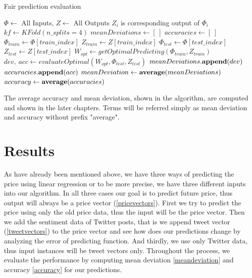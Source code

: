 \documentclass[a4paper,11pt,oneside]{article}
\begin{document}
  \begin{algorithm}
  	\caption{Fair prediction evaluation}
  	\begin{algorithmic} 
  		\REQUIRE $\Phi \leftarrow$ All Inputs, $Z \leftarrow$ All Outputs
  		\ENSURE $Z_i$ is corresponding output of $\Phi_i$ 
  		\STATE 
  		$kf \leftarrow KFold(n\_splits=4)$ \cite{pythonkfold}
  		\STATE $meanDeviations \leftarrow [\ ]$
  		\STATE $accuracies \leftarrow [\ ]$
  		\STATE $\Phi_{train} \leftarrow \Phi[train\_index]$
  		\STATE $Z_{train} \leftarrow Z[train\_index]$
  		\STATE $\Phi_{test} \leftarrow \Phi[test\_index]$
  		\STATE $Z_{test} \leftarrow Z[test\_index]$
  		\STATE $W_{opt}  \leftarrow getOptimalPredicting(\Phi_{train}, Z_{train})$
  		\STATE $dev,\ acc \leftarrow evaluateOptimal(W_{opt}, \Phi_{test}, Z_{test})$
  		\STATE $ meanDeviations{\bf .append}(dev) $
  		\STATE $ accuracies{\bf .append}(acc) $
  		\ENDFOR
  		\STATE $meanDeviation \leftarrow {\bf average}(meanDeviations)$
  		\STATE $accuracy \leftarrow {\bf average}(accuracies)$
  	\end{algorithmic}
  \end{algorithm}
  
  The average accuracy and mean deviation, shown in the algorithm, are computed and shown in the later chapters. Terms will be referred simply as mean deviation and accuracy without prefix "average".
  
  \section{Results}
  
  As have already been mentioned above, we have three ways of predicting the price using linear regression or to be more precise, we have three different inputs into our algorithm. In all three cases our goal is to predict future price, thus output will always be a price vector (\ref{pricevectors}). First we try to predict the price using only the old price data, thus the input will be the price vector. Then we add the sentiment data of Twitter posts, that is we append tweet vector (\ref{tweetvectors}) to the price vector and see how does our predictions change by analyzing the error of predicting function. And thirdly, we use only Twitter data, thus input instances will be tweet vectors only. Throughout the process, we evaluate the performance by computing mean deviation \eqref{meandeviation} and accuracy \eqref{accuracy} for our predictions. 
  
\end{document}
